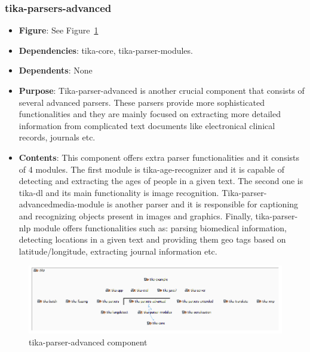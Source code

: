 \documentclass{article}
\begin{document}
\subsubsection{tika-parsers-advanced}
\begin {itemize}
\item \textbf{Figure}: See Figure~\ref{fig:tika-parser-advanced}
\item \textbf{Dependencies}: tika-core, tika-parser-modules.
\item \textbf{Dependents}:  None
\item \textbf{Purpose}: Tika-parser-advanced is another crucial component that consists of several advanced parsers. These parsers provide more sophisticated functionalities and they are mainly focused on extracting more detailed information from complicated text documents like electronical clinical records, journals etc. 
\item \textbf{Contents}: This component offers extra parser functionalities and it consists of 4 modules. The first module is tika-age-recognizer and it is capable of detecting and extracting the ages of people in a given text. The second one is tika-dl and its main functionality is image recognition. Tika-parser-advancedmedia-module is another parser and it is responsible for captioning and recognizing objects present in images and graphics.  Finally, tika-parser-nlp module offers functionalities such as: parsing biomedical information, detecting locations in a given text and providing them geo tags based on latitude/longitude, extracting journal information etc.
\end{itemize}
\begin{figure}[h!]
    \centering
    \includegraphics[width=1\textwidth]{report/images/tika-parser-advanced.PNG}
    \caption{tika-parser-advanced component}
    \label{fig:tika-parser-advanced}
\end{figure}
\end{document}
